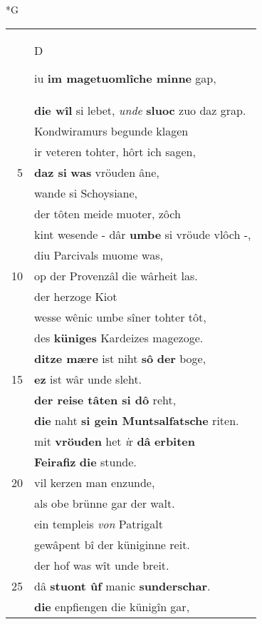\documentclass[8pt,a4paper,notitlepage]{article}
\begin{document}
\begin{table}[ht]
\begin{minipage}[t]{0.5\linewidth}
\small
\begin{center}*G
\end{center}
\begin{tabular}{rl}
 & \begin{large}D\end{large}iu \textbf{im magetuomlîche minne} gap,\\ 
 & \textbf{die wîl} si lebet, \textit{unde} \textbf{sluoc} zuo daz grap.\\ 
 & Kondwiramurs begunde klagen\\ 
 & ir veteren tohter, hôrt ich sagen,\\ 
5 & \textbf{daz si} \textbf{was} vröuden âne,\\ 
 & wande si Schoysiane,\\ 
 & der tôten meide muoter, zôch\\ 
 & kint wesende - dâr \textbf{umbe} si vröude vlôch -,\\ 
 & diu Parcivals muome was,\\ 
10 & op der Provenzâl die wârheit las.\\ 
 & der herzoge Kiot\\ 
 & wesse wênic umbe sîner tohter tôt,\\ 
 & des \textbf{küniges} Kardeizes magezoge.\\ 
 & \textbf{ditze mære} ist niht \textbf{sô} \textbf{der} boge,\\ 
15 & \textbf{ez} ist wâr unde sleht.\\ 
 & \textbf{der reise tâten si dô} reht,\\ 
 & \textbf{die} naht \textbf{si gein Muntsalfatsche} riten.\\ 
 & mit \textbf{vröuden} het \textit{i}r \textbf{dâ} \textbf{erbiten}\\ 
 & \textbf{Feirafiz} \textbf{die} stunde.\\ 
20 & vil kerzen man enzunde,\\ 
 & als obe brünne gar der walt.\\ 
 & ein templeis \textit{von} Patrigalt\\ 
 & gewâpent bî der küniginne reit.\\ 
 & der hof was wît unde breit.\\ 
25 & dâ \textbf{stuont ûf} manic \textbf{sunderschar}.\\ 
 & \textbf{die} enpfiengen die künigîn gar,\\ 

\end{tabular}
\end{minipage}
\end{table}
\end{document}
